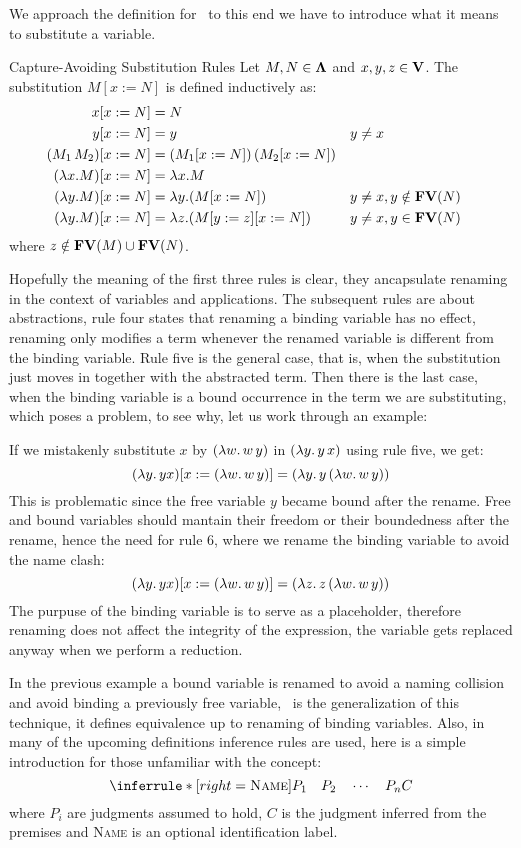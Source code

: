 We approach the definition for \aequiv \, to this end we have to introduce what it means to substitute a variable.

\begin{definition}Capture-Avoiding Substitution Rules
  Let \( M, N \in \mathbf{\Lambda} \) and \( x, y, z \in \mathbf{V} \). The substitution \( M[x := N] \) is defined inductively as:
  \[
    \begin{aligned}
      x[x := N]                       & = N \\
      y[x := N]                       & = y && y \neq x \\
      (M_1\, M_2)[x := N]             & = (M_1[x := N])\,(M_2[x := N]) \\
      (\lambda x. M)[x := N]          & = \lambda x. M \\
      (\lambda y. M)[x := N]          & = \lambda y. (M[x := N]) && y \neq x, y \notin \mathbf{FV}( N ) \\
      (\lambda y. M)[x := N]          & = \lambda z. (M[y := z][x := N]) && y \neq x, y \in \mathbf{FV}( N )
    \end{aligned}
  \]
  where \( z \notin \mathbf{FV}( M ) \cup \mathbf{FV}( N ) \).
\end{definition}
Hopefully the meaning of the first three rules is clear, they ancapsulate renaming in the context of variables and applications. The subsequent rules are about abstractions, rule four states that renaming a binding variable has no effect, renaming only modifies a term whenever the renamed variable is different from the binding variable. Rule five is the general case, that is, when the substitution just moves in together with the abstracted term. Then there is the last case, when the binding variable is a bound occurrence in the term we are substituting, which poses a problem, to see why, let us work through an example:
\begin{example} If we mistakenly substitute $x$ by \( (\lambda w . \, w \, y) \) in \( (\lambda y . \, y \, x ) \) using rule five, we get:
  \[
    (\lambda y . \, y x) [x := (\lambda w . \, w \, y)] = (\lambda y . \, y \, (\lambda w. \, w \, y))
  \]
  This is problematic since the free variable $y$ became bound after the rename. Free and bound variables should mantain their freedom or their boundedness after the rename, hence the need for rule 6, where we rename the binding variable to avoid the name clash:
  \[
    (\lambda y . \, y x) [x := (\lambda w . \, w \, y)] = (\lambda z . \, z \, (\lambda w. \, w \, y))
  \]
  The purpuse of the binding variable is to serve as a placeholder, therefore renaming does not affect the integrity of the expression, the variable gets replaced anyway when we perform a reduction.
\end{example}
In the previous example a bound variable is renamed to avoid a naming collision and avoid binding a previously free variable, \aequiv \ is the generalization of this technique, it defines equivalence up to renaming of binding variables. Also, in many of the upcoming definitions inference rules are used, here is a simple introduction for those unfamiliar with the concept:
\[
\inferrule*[right=\textsc{Name}]{
  P_1 \quad P_2 \quad \cdots \quad P_n
}{
  C
}
\]
where $P_i$ are judgments assumed to hold, $C$ is the judgment inferred from the premises and \textsc{Name} is an optional identification label.

